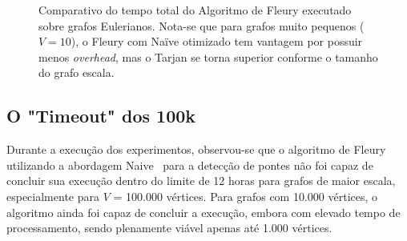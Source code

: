 \documentclass{sbc2023}%
\begin{document}
\begin{figure}[H]
    \centering
    \caption{Comparativo do tempo total do Algoritmo de Fleury executado sobre grafos Eulerianos. Nota-se que para grafos muito pequenos ($V=10$), o Fleury com Naïve otimizado tem vantagem por possuir menos \textit{overhead}, mas o Tarjan se torna superior conforme o tamanho do grafo escala.}
    \label{fig:grafico_fleury}
\end{figure}


\subsection{O "Timeout" dos 100k}

Durante a execução dos experimentos, observou-se que o algoritmo de Fleury~\citep{AlgoFleury} utilizando a abordagem Naive~\cite{cormen2022Naive} para a detecção de pontes não foi capaz de concluir sua execução dentro do limite de 12 horas para grafos de maior escala, especialmente para $V$ = 100.000 vértices. Para grafos com 10.000 vértices, o algoritmo ainda foi capaz de concluir a execução, embora com elevado tempo de processamento, sendo plenamente viável apenas até 1.000 vértices.
\end{document}
